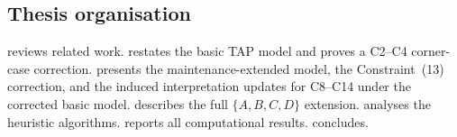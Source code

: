 \subsection*{Thesis organisation}

 reviews related work.   restates the
basic TAP model and proves a C2--C4 corner-case correction.  
presents the maintenance-extended model, the Constraint~(13) correction, and
the induced interpretation updates for C8--C14 under the corrected basic model.
 describes the
full $\{A,B,C,D\}$ extension.   analyses the heuristic
algorithms.   reports all computational results.
 concludes.
